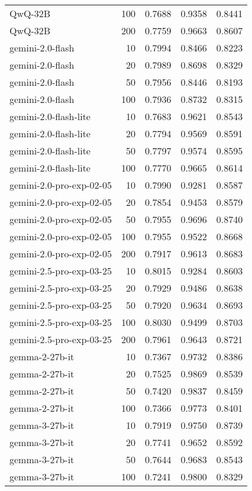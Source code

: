 \begin{tabular}{lrrrr}
QwQ-32B & 100 & 0.7688 & 0.9358 & 0.8441 \\
QwQ-32B & 200 & 0.7759 & 0.9663 & 0.8607 \\
gemini-2.0-flash & 10 & 0.7994 & 0.8466 & 0.8223 \\
gemini-2.0-flash & 20 & 0.7989 & 0.8698 & 0.8329 \\
gemini-2.0-flash & 50 & 0.7956 & 0.8446 & 0.8193 \\
gemini-2.0-flash & 100 & 0.7936 & 0.8732 & 0.8315 \\
gemini-2.0-flash-lite & 10 & 0.7683 & 0.9621 & 0.8543 \\
gemini-2.0-flash-lite & 20 & 0.7794 & 0.9569 & 0.8591 \\
gemini-2.0-flash-lite & 50 & 0.7797 & 0.9574 & 0.8595 \\
gemini-2.0-flash-lite & 100 & 0.7770 & 0.9665 & 0.8614 \\
gemini-2.0-pro-exp-02-05 & 10 & 0.7990 & 0.9281 & 0.8587 \\
gemini-2.0-pro-exp-02-05 & 20 & 0.7854 & 0.9453 & 0.8579 \\
gemini-2.0-pro-exp-02-05 & 50 & 0.7955 & 0.9696 & 0.8740 \\
gemini-2.0-pro-exp-02-05 & 100 & 0.7955 & 0.9522 & 0.8668 \\
gemini-2.0-pro-exp-02-05 & 200 & 0.7917 & 0.9613 & 0.8683 \\
gemini-2.5-pro-exp-03-25 & 10 & 0.8015 & 0.9284 & 0.8603 \\
gemini-2.5-pro-exp-03-25 & 20 & 0.7929 & 0.9486 & 0.8638 \\
gemini-2.5-pro-exp-03-25 & 50 & 0.7920 & 0.9634 & 0.8693 \\
gemini-2.5-pro-exp-03-25 & 100 & 0.8030 & 0.9499 & 0.8703 \\
gemini-2.5-pro-exp-03-25 & 200 & 0.7961 & 0.9643 & 0.8721 \\
gemma-2-27b-it & 10 & 0.7367 & 0.9732 & 0.8386 \\
gemma-2-27b-it & 20 & 0.7525 & 0.9869 & 0.8539 \\
gemma-2-27b-it & 50 & 0.7420 & 0.9837 & 0.8459 \\
gemma-2-27b-it & 100 & 0.7366 & 0.9773 & 0.8401 \\
gemma-3-27b-it & 10 & 0.7919 & 0.9750 & 0.8739 \\
gemma-3-27b-it & 20 & 0.7741 & 0.9652 & 0.8592 \\
gemma-3-27b-it & 50 & 0.7644 & 0.9683 & 0.8543 \\
gemma-3-27b-it & 100 & 0.7241 & 0.9800 & 0.8329 \\

\end{tabular}
